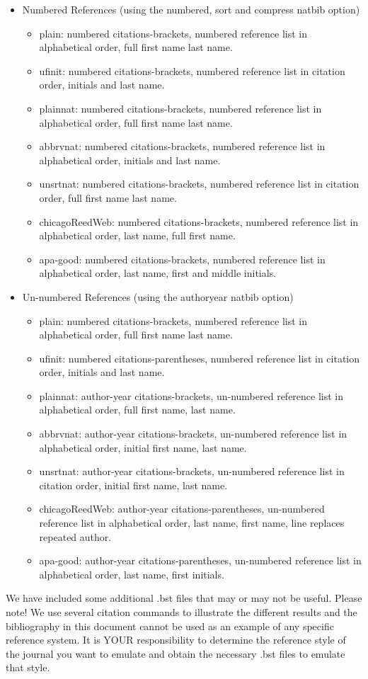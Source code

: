 \begin{itemize}
\item Numbered References (using the numbered, sort and compress natbib option)
\begin{itemize}
\item plain: numbered citations-brackets, numbered reference list in alphabetical order, full first name last name.
\item ufinit: numbered citations-brackets, numbered reference list in citation order, initials and last name.
\item plainnat: numbered citations-brackets, numbered reference list in alphabetical order, full first name last name.
\item abbrvnat: numbered citations-brackets, numbered reference list in alphabetical order, initials and last name.
\item unsrtnat: numbered citations-brackets, numbered reference list in citation order, full first name last name.
\item chicagoReedWeb: numbered citations-brackets, numbered reference list in alphabetical order, last name, full first name.
\item apa-good: numbered citations-brackets, numbered reference list in alphabetical order, last name, first and middle initials.
\end{itemize}
\item Un-numbered References (using the authoryear natbib option)
\begin{itemize}
\item plain: numbered citations-brackets, numbered reference list in alphabetical order, full first name last name.
\item ufinit: numbered citations-parentheses, numbered reference list in citation order, initials and last name.
\item plainnat: author-year citations-brackets, un-numbered reference list in alphabetical order, full first name, last name.
\item abbrvnat: author-year citations-brackets, un-numbered reference list in alphabetical order, initial first name, last name.
\item unsrtnat: author-year citations-brackets, un-numbered reference list in citation order, initial first name, last name.
\item chicagoReedWeb: author-year citations-parentheses, un-numbered reference list in alphabetical order, last name, first name, line replaces repeated author.
\item apa-good: author-year citations-parentheses, un-numbered reference list in alphabetical order, last name, first initials.
\end{itemize}
\end{itemize}
We have included some additional .bst files that may or may not be useful. Please note! We use several citation commands to illustrate the different results and the bibliography in this document cannot be used as an example of any specific reference system. It is YOUR responsibility to  determine the reference style of the journal you want to emulate and obtain the necessary .bst files to emulate that style.
